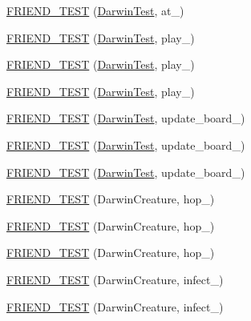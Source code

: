 \begin{DoxyCompactItemize}
\item 
\hyperlink{classDarwin_a86c3957db93c3bc8ce5329a35e568704}{F\-R\-I\-E\-N\-D\-\_\-\-T\-E\-S\-T} (\hyperlink{classDarwin_a9e02add6ec6cd0cafdde4b8fdd0cde3a}{Darwin\-Test}, at\-\_)
\item 
\hyperlink{classDarwin_aa572d1a651073c94e8e3b16bbcb9dba6}{F\-R\-I\-E\-N\-D\-\_\-\-T\-E\-S\-T} (\hyperlink{classDarwin_a9e02add6ec6cd0cafdde4b8fdd0cde3a}{Darwin\-Test}, play\-\_)
\item 
\hyperlink{classDarwin_a0361d55bd14b7eb035a965288deb0e50}{F\-R\-I\-E\-N\-D\-\_\-\-T\-E\-S\-T} (\hyperlink{classDarwin_a9e02add6ec6cd0cafdde4b8fdd0cde3a}{Darwin\-Test}, play\-\_)
\item 
\hyperlink{classDarwin_a3c8d5eebc9cc216e4df06bef3f55c942}{F\-R\-I\-E\-N\-D\-\_\-\-T\-E\-S\-T} (\hyperlink{classDarwin_a9e02add6ec6cd0cafdde4b8fdd0cde3a}{Darwin\-Test}, play\-\_)
\item 
\hyperlink{classDarwin_a3b779b264ab2f2c5546128e3c037f565}{F\-R\-I\-E\-N\-D\-\_\-\-T\-E\-S\-T} (\hyperlink{classDarwin_a9e02add6ec6cd0cafdde4b8fdd0cde3a}{Darwin\-Test}, update\-\_\-board\-\_)
\item 
\hyperlink{classDarwin_a79b29acf8e791f2ea69ba4793c581967}{F\-R\-I\-E\-N\-D\-\_\-\-T\-E\-S\-T} (\hyperlink{classDarwin_a9e02add6ec6cd0cafdde4b8fdd0cde3a}{Darwin\-Test}, update\-\_\-board\-\_)
\item 
\hyperlink{classDarwin_a743da933ec9239ff91fb07a130022bb7}{F\-R\-I\-E\-N\-D\-\_\-\-T\-E\-S\-T} (\hyperlink{classDarwin_a9e02add6ec6cd0cafdde4b8fdd0cde3a}{Darwin\-Test}, update\-\_\-board\-\_)
\item 
\hyperlink{classDarwin_a6741fad7330e40a29a1620427fc1e755}{F\-R\-I\-E\-N\-D\-\_\-\-T\-E\-S\-T} (Darwin\-Creature, hop\-\_)
\item 
\hyperlink{classDarwin_ab4c87c55e0bbb531002c8ed54237eb53}{F\-R\-I\-E\-N\-D\-\_\-\-T\-E\-S\-T} (Darwin\-Creature, hop\-\_)
\item 
\hyperlink{classDarwin_aab49693bb9921ed3f984f73c33b568e8}{F\-R\-I\-E\-N\-D\-\_\-\-T\-E\-S\-T} (Darwin\-Creature, hop\-\_)
\item 
\hyperlink{classDarwin_a7a1a28f2702e2143b252dcb05081d568}{F\-R\-I\-E\-N\-D\-\_\-\-T\-E\-S\-T} (Darwin\-Creature, infect\-\_)
\item 
\hyperlink{classDarwin_a9562a0e4b6f322b7b278a504547ea353}{F\-R\-I\-E\-N\-D\-\_\-\-T\-E\-S\-T} (Darwin\-Creature, infect\-\_)
\end{DoxyCompactItemize}
